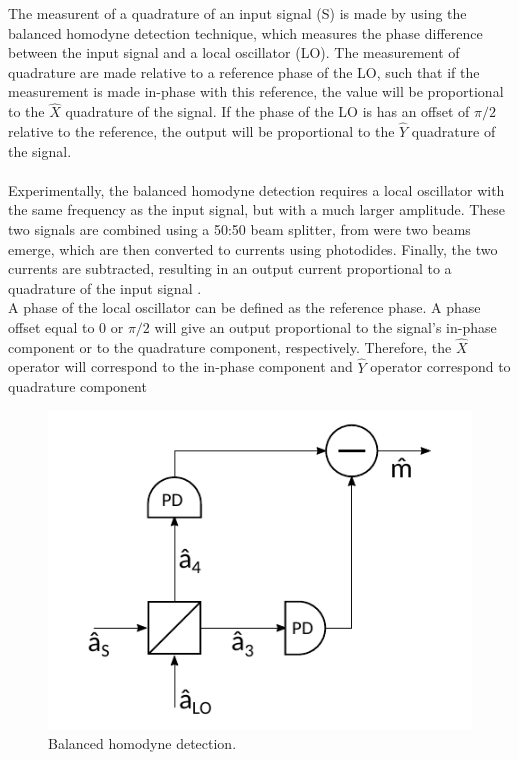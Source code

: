 The measurent of a quadrature of an input signal (S) is made by using the balanced homodyne detection technique, which measures the phase difference between the input signal and a local oscillator (LO). The measurement of quadrature are made relative to a reference phase of the LO, such that if the measurement is made in-phase with this reference, the value will be proportional to the $\hat{X}$ quadrature of the signal. If the phase of the LO is has an offset of $\pi/2$ relative to the reference, the output will be proportional to the $\hat{Y}$ quadrature of the signal.\\
\\
Experimentally, the balanced homodyne detection requires a local oscillator with the same frequency as the input signal, but with a much larger amplitude. These two signals are combined using a 50:50 beam splitter, from were two beams emerge, which are then converted to currents using photodides. Finally, the two currents are subtracted, resulting in an output current proportional to a quadrature of the input signal
\cite{fox2006}.\\
%
A phase of the local oscillator can be defined as the reference phase. A phase offset equal to $0$ or $\pi/2$ will give an output proportional to the signal's in-phase component or to the quadrature component, respectively. Therefore, the $\hat{X}$ operator will correspond to the in-phase component and $\hat{Y}$ operator correspond to quadrature component
\\
%
\begin{figure}[H]
	\label{fig:scheme_homodyne}
	\centering
	\includegraphics{./sdf/optical_detection/figures/scheme_homodyne.pdf}
	\caption{Balanced homodyne detection.}
\end{figure}
